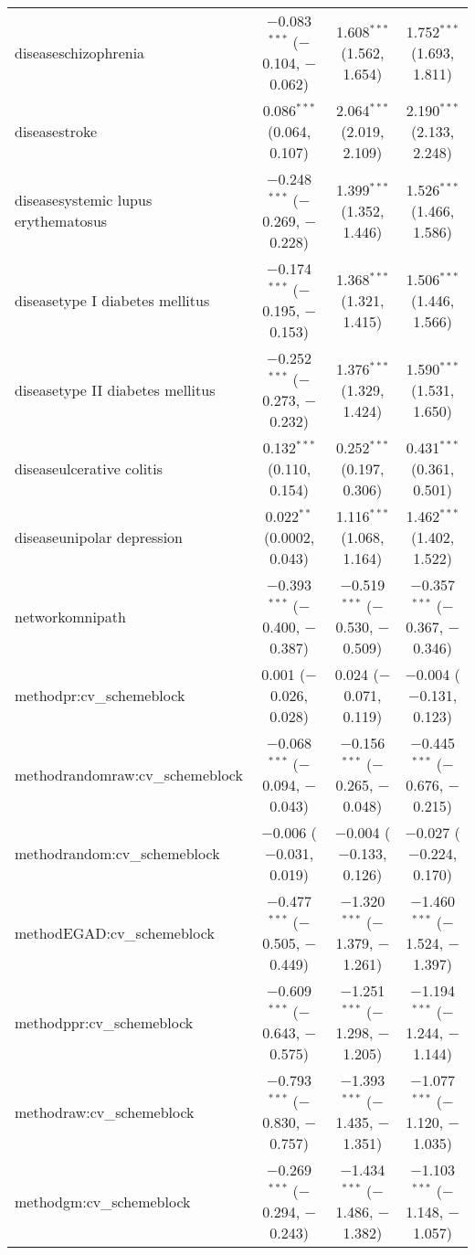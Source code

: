 \begin{table}[!htbp]
\begin{tabular}{@{\extracolsep{5pt}}lccc}
  diseaseschizophrenia & $-$0.083$^{***}$ ($-$0.104, $-$0.062) & 1.608$^{***}$ (1.562, 1.654) & 1.752$^{***}$ (1.693, 1.811) \\ 
  diseasestroke & 0.086$^{***}$ (0.064, 0.107) & 2.064$^{***}$ (2.019, 2.109) & 2.190$^{***}$ (2.133, 2.248) \\ 
  diseasesystemic lupus erythematosus & $-$0.248$^{***}$ ($-$0.269, $-$0.228) & 1.399$^{***}$ (1.352, 1.446) & 1.526$^{***}$ (1.466, 1.586) \\ 
  diseasetype I diabetes mellitus & $-$0.174$^{***}$ ($-$0.195, $-$0.153) & 1.368$^{***}$ (1.321, 1.415) & 1.506$^{***}$ (1.446, 1.566) \\ 
  diseasetype II diabetes mellitus & $-$0.252$^{***}$ ($-$0.273, $-$0.232) & 1.376$^{***}$ (1.329, 1.424) & 1.590$^{***}$ (1.531, 1.650) \\ 
  diseaseulcerative colitis & 0.132$^{***}$ (0.110, 0.154) & 0.252$^{***}$ (0.197, 0.306) & 0.431$^{***}$ (0.361, 0.501) \\ 
  diseaseunipolar depression & 0.022$^{**}$ (0.0002, 0.043) & 1.116$^{***}$ (1.068, 1.164) & 1.462$^{***}$ (1.402, 1.522) \\ 
  networkomnipath & $-$0.393$^{***}$ ($-$0.400, $-$0.387) & $-$0.519$^{***}$ ($-$0.530, $-$0.509) & $-$0.357$^{***}$ ($-$0.367, $-$0.346) \\ 
  methodpr:cv\_schemeblock & 0.001 ($-$0.026, 0.028) & 0.024 ($-$0.071, 0.119) & $-$0.004 ($-$0.131, 0.123) \\ 
  methodrandomraw:cv\_schemeblock & $-$0.068$^{***}$ ($-$0.094, $-$0.043) & $-$0.156$^{***}$ ($-$0.265, $-$0.048) & $-$0.445$^{***}$ ($-$0.676, $-$0.215) \\ 
  methodrandom:cv\_schemeblock & $-$0.006 ($-$0.031, 0.019) & $-$0.004 ($-$0.133, 0.126) & $-$0.027 ($-$0.224, 0.170) \\ 
  methodEGAD:cv\_schemeblock & $-$0.477$^{***}$ ($-$0.505, $-$0.449) & $-$1.320$^{***}$ ($-$1.379, $-$1.261) & $-$1.460$^{***}$ ($-$1.524, $-$1.397) \\ 
  methodppr:cv\_schemeblock & $-$0.609$^{***}$ ($-$0.643, $-$0.575) & $-$1.251$^{***}$ ($-$1.298, $-$1.205) & $-$1.194$^{***}$ ($-$1.244, $-$1.144) \\ 
  methodraw:cv\_schemeblock & $-$0.793$^{***}$ ($-$0.830, $-$0.757) & $-$1.393$^{***}$ ($-$1.435, $-$1.351) & $-$1.077$^{***}$ ($-$1.120, $-$1.035) \\ 
  methodgm:cv\_schemeblock & $-$0.269$^{***}$ ($-$0.294, $-$0.243) & $-$1.434$^{***}$ ($-$1.486, $-$1.382) & $-$1.103$^{***}$ ($-$1.148, $-$1.057) \\ 

\end{tabular}
\end{table}
